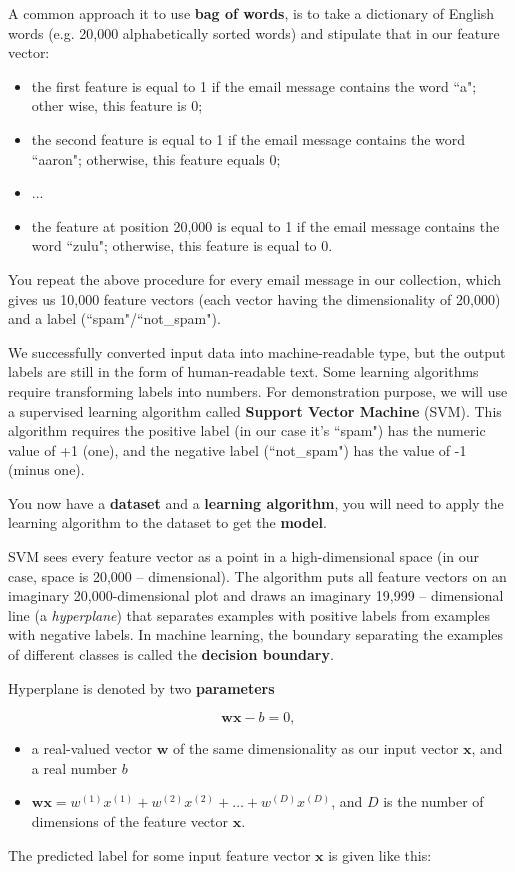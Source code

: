 A common approach it to use \textbf{bag of words}, is to take a dictionary of English words (e.g. 20,000 alphabetically sorted words) and stipulate that in our feature vector:
\begin{itemize}
	\item the first feature is equal to 1 if the email message contains the word ``a"; other wise, this feature is 0;
	\item the second feature is equal to 1 if the email message contains the word ``aaron"; otherwise, this feature equals 0;
	\item ...
	\item the feature at position 20,000 is equal to 1 if the email message contains the word ``zulu"; otherwise, this feature is equal to 0.
\end{itemize}
You repeat the above procedure for every email message in our collection, which gives us 10,000 feature vectors (each vector having the dimensionality of 20,000) and a label (``spam"/``not\_spam").

We successfully converted input data into machine-readable type, but the output labels are still in the form of human-readable text. Some learning algorithms require transforming labels into numbers. For demonstration purpose, we will use a supervised learning algorithm called \textbf{Support Vector Machine} (SVM). This algorithm requires the positive label (in our case it's ``spam") has the numeric value of +1 (one), and the negative label (``not\_spam") has the value of -1 (minus one).

You now have a \textbf{dataset} and a \textbf{learning algorithm}, you will need to apply the learning algorithm to the dataset to get the \textbf{model}.

SVM sees every feature vector as a point in a high-dimensional space (in our case, space is 20,000 -- dimensional). The algorithm puts all feature vectors on an imaginary 20,000-dimensional plot and draws an imaginary 19,999 -- dimensional line (a \textit{hyperplane}) that separates examples with positive labels from examples with negative labels. In machine learning, the boundary separating the examples of different classes is called the \textbf{decision boundary}.

Hyperplane is denoted by two \textbf{parameters}

\[ \mathbf{w} \mathbf{x}-b=0 \text {, } \]
\begin{itemize}
	\item a real-valued vector $\mathbf{w}$ of the same dimensionality as our input vector $\mathbf{x}$, and a real number $b$
	\item $\mathbf{w} \mathbf{x}= w^{(1)} x^{(1)}+w^{(2)} x^{(2)}+\ldots+w^{(D)} x^{(D)}$, and $D$ is the number of dimensions of the feature vector $\mathbf{x}$.
\end{itemize}
The predicted label for some input feature vector $\mathbf{x}$ is given like this:

